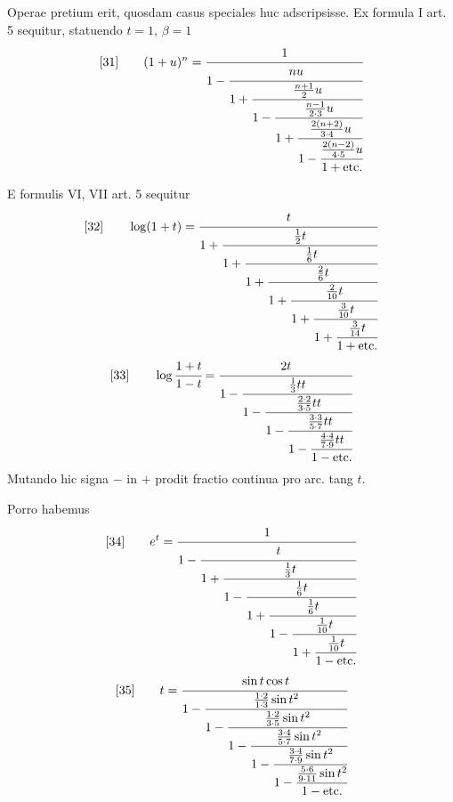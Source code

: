 Operae pretium erit, quosdam casus speciales huc adscripsisse. Ex formula I art. 5 sequitur, statuendo $t=1$, $\beta=1$
\[
[31]\qquad
(1+u)^n=
\cfrac{1}{1-\cfrac{nu}{1+\cfrac{\frac{n+1}{2}u}{1-\cfrac{\frac{n-1}{2\cdot3}u}{1+\cfrac{\frac{2(n+2)}{3\cdot4}u}{1-\cfrac{\frac{2(n-2)}{4\cdot5}u}{1+\mathrm{etc.}}}}}}}
\]

E formulis VI, VII art. 5 sequitur
\[
[32]\qquad
\log(1+t)=
\cfrac{t}{1+\cfrac{\frac12t}{1+\cfrac{\frac16t}{1+\cfrac{\frac26t}{1+\cfrac{\frac2{10}t}{1+\cfrac{\frac3{10}t}{1+\cfrac{\frac3{14}t}{1+\mathrm{etc.}}}}}}}}
\]
\[
[33]\qquad
\log\cfrac{1+t}{1-t}=
\cfrac{2t}{1-\cfrac{\frac13tt}{1-\cfrac{\frac{2\cdot2}{3\cdot5}tt}{1-\cfrac{\frac{3\cdot3}{5\cdot7}tt}{1-\cfrac{\frac{4\cdot4}{7\cdot9}tt}{1-\mathrm{etc.}}}}}}
\]
Mutando hic signa $-$ in $+$ prodit fractio continua pro arc. tang $t$.
\par
Porro habemus
\[
[34]\qquad
e^t=
\cfrac{1}{1-\cfrac{t}{1+\cfrac{\frac13t}{1-\cfrac{\frac16t}{1+\cfrac{\frac16t}{1-\cfrac{\frac1{10}t}{1+\cfrac{\frac1{10}t}{1-\mathrm{etc.}}}}}}}}
\]
\[
[35]\qquad
t=
\cfrac{\sin t\cos t}{1-\cfrac{\frac{1\cdot2}{1\cdot3}\sin t^2}{1-\cfrac{\frac{1\cdot2}{3\cdot5}\sin t^2}{1-\cfrac{\frac{3\cdot4}{5\cdot7}\sin t^2}{1-\cfrac{\frac{3\cdot4}{7\cdot9}\sin t^2}{1-\cfrac{\frac{5\cdot6}{9\cdot11}\sin t^2}{1-\mathrm{etc.}}}}}}}
\]

